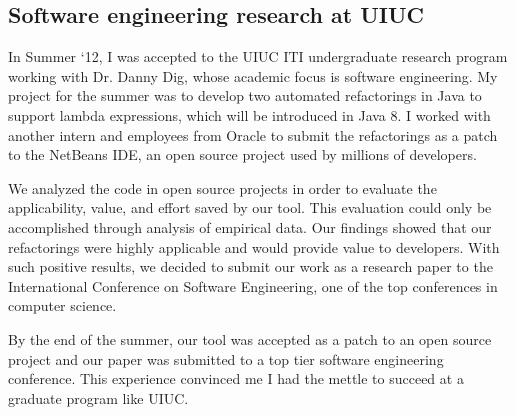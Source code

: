 \subsection{Software engineering research at UIUC}
In Summer ‘12, I was accepted to the UIUC ITI undergraduate research program working with Dr. Danny Dig, whose academic focus is software engineering. 
My project for the summer was to develop two automated refactorings in Java to support lambda expressions, which will be introduced in Java 8. 
I worked with another intern and employees from Oracle to submit the refactorings as a patch to the NetBeans IDE, an open source project used by millions of developers. 

We analyzed the code in open source projects in order to evaluate the applicability, value, and effort saved by our tool. 
This evaluation could only be accomplished through analysis of empirical data. 
Our findings showed that our refactorings were highly applicable and would provide value to developers. 
With such positive results, we decided to submit our work as a research paper to the International Conference on Software Engineering, one of the top conferences in computer science. 

By the end of the summer, our tool was accepted as a patch to an open source project and our paper was submitted to a top tier software engineering conference. 
This experience convinced me I had the mettle to succeed at a graduate program like UIUC.